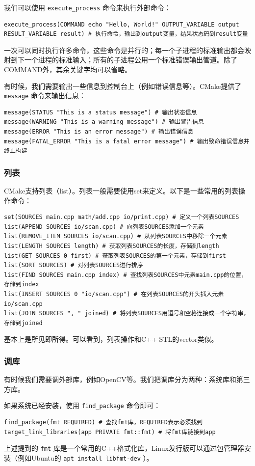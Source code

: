 我们可以使用 \texttt{execute\_process} 命令来执行外部命令：
\begin{verbatim}
execute_process(COMMAND echo "Hello, World!" OUTPUT_VARIABLE output RESULT_VARIABLE result) # 执行命令，输出到output变量，结果状态码到result变量
\end{verbatim}
一次可以同时执行许多命令，这些命令是并行的；每一个子进程的标准输出都会映射到下一个进程的标准输入；所有的子进程公用一个标准错误输出管道。除了COMMAND外，其余关键字均可以省略。

有时候，我们需要输出一些信息到控制台上（例如错误信息等）。CMake提供了 \texttt{message} 命令来输出信息：
\begin{verbatim}
message(STATUS "This is a status message") # 输出状态信息
message(WARNING "This is a warning message") # 输出警告信息
message(ERROR "This is an error message") # 输出错误信息
message(FATAL_ERROR "This is a fatal error message") # 输出致命错误信息并终止构建
\end{verbatim}

\subsubsection{列表}

CMake支持列表（list）。列表一般需要使用set来定义。以下是一些常用的列表操作命令：
\begin{verbatim}
set(SOURCES main.cpp math/add.cpp io/print.cpp) # 定义一个列表SOURCES
list(APPEND SOURCES io/scan.cpp) # 向列表SOURCES添加一个元素
list(REMOVE_ITEM SOURCES io/scan.cpp) # 从列表SOURCES中移除一个元素
list(LENGTH SOURCES length) # 获取列表SOURCES的长度，存储到length
list(GET SOURCES 0 first) # 获取列表SOURCES的第一个元素，存储到first
list(SORT SOURCES) # 对列表SOURCES进行排序
list(FIND SOURCES main.cpp index) # 查找列表SOURCES中元素main.cpp的位置，存储到index
list(INSERT SOURCES 0 "io/scan.cpp") # 在列表SOURCES的开头插入元素io/scan.cpp
list(JOIN SOURCES ", " joined) # 将列表SOURCES用逗号和空格连接成一个字符串，存储到joined
\end{verbatim}

基本上是所见即所得。可以看到，列表操作和C++ STL的vector类似。

\subsubsection{调库}

有时候我们需要调外部库，例如OpenCV等。我们把调库分为两种：系统库和第三方库。

如果系统已经安装，使用 \texttt{find\_package} 命令即可：
\begin{verbatim}
find_package(fmt REQUIRED) # 查找fmt库，REQUIRED表示必须找到
target_link_libraries(app PRIVATE fmt::fmt) # 将fmt库链接到app
\end{verbatim}
上述提到的 \texttt{fmt} 库是一个常用的C++格式化库，Linux发行版可以通过包管理器安装（例如Ubuntu的 \texttt{apt install libfmt-dev} ）。

